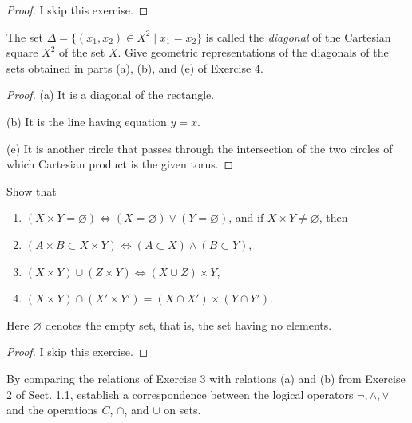 \begin{proof}
    I skip this exercise.
\end{proof}
\newpage

\begin{exercise}
    The set $\Delta = \{ (x_{1}, x_{2})\in X^{2} \mid x_{1} = x_{2} \}$ is called the \textit{diagonal} of the Cartesian square $X^{2}$ of the set $X$. Give geometric representations of the diagonals of the sets
    obtained in parts (a), (b), and (e) of Exercise 4.
\end{exercise}

\begin{proof}
    (a) It is a diagonal of the rectangle.

    (b) It is the line having equation $y = x$.

    (e) It is another circle that passes through the intersection of the two circles of which Cartesian product is the given torus.
\end{proof}
\newpage

\begin{exercise}
    Show that
    \begin{enumerate}[label={(\alph*)}]
        \item $(X\times Y = \varnothing) \Leftrightarrow (X = \varnothing) \lor (Y = \varnothing)$, and if $X\times Y\ne \varnothing$, then
        \item $(A\times B\subset X\times Y) \Leftrightarrow (A\subset X)\land (B\subset Y)$,
        \item $(X\times Y)\cup (Z\times Y) \Leftrightarrow (X\cup Z)\times Y$,
        \item $(X \times Y) \cap (X'\times Y') = (X \cap X') \times (Y \cap Y')$.
    \end{enumerate}

    Here $\varnothing$ denotes the empty set, that is, the set having no elements.
\end{exercise}

\begin{proof}
    I skip this exercise.
\end{proof}
\newpage

\begin{exercise}
    By comparing the relations of Exercise 3 with relations (a) and (b) from Exercise 2 of Sect. 1.1, establish a correspondence between the logical operators $\neg, \land, \lor$ and the operations $C$, $\cap$, and $\cup$ on sets.
\end{exercise}

